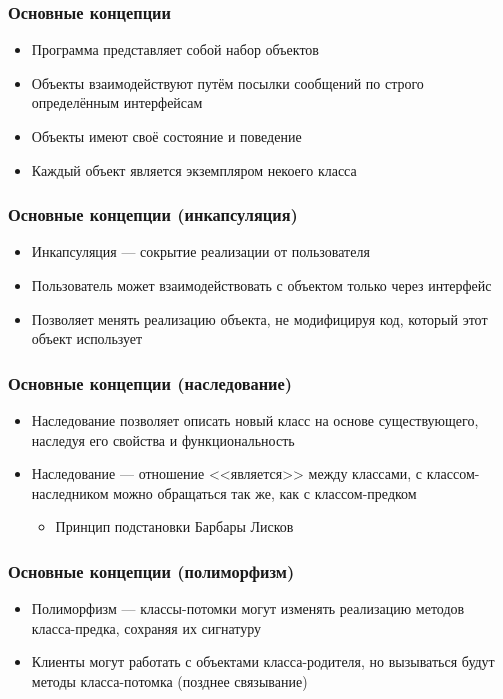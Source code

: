 \documentclass[xetex,mathserif,serif]{beamer}
\begin{document}
    \begin{frame}
        \frametitle{Основные концепции}
        \begin{itemize}
            \item Программа представляет собой набор объектов
            \item Объекты взаимодействуют путём посылки сообщений по строго определённым интерфейсам
            \item Объекты имеют своё состояние и поведение
            \item Каждый объект является экземпляром некоего класса
        \end{itemize}
    \end{frame}

    \begin{frame}
        \frametitle{Основные концепции (инкапсуляция)}
        \begin{itemize}
            \item Инкапсуляция --- сокрытие реализации от пользователя
            \item Пользователь может взаимодействовать с объектом только через интерфейс
            \item Позволяет менять реализацию объекта, не модифицируя код, который этот объект использует
        \end{itemize}
    \end{frame}

    \begin{frame}
        \frametitle{Основные концепции (наследование)}
        \begin{itemize}
            \item Наследование позволяет описать новый класс на основе существующего, наследуя его свойства и функциональность
            \item Наследование --- отношение <<является>> между классами, с классом-наследником можно обращаться так же, как с классом-предком
            \begin{itemize}
                \item Принцип подстановки Барбары Лисков
            \end{itemize}
        \end{itemize}
    \end{frame}

    \begin{frame}
        \frametitle{Основные концепции (полиморфизм)}
        \begin{itemize}
            \item Полиморфизм --- классы-потомки могут изменять реализацию методов класса-предка, сохраняя их сигнатуру
            \item Клиенты могут работать с объектами класса-родителя, но вызываться будут методы класса-потомка (позднее связывание)
        \end{itemize}
    \end{frame}
\end{document}
